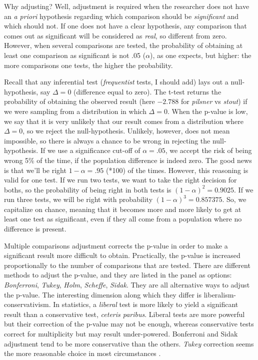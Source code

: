 \documentclass[
]{book}
\begin{document}
Why adjusting? Well, adjustment is required when the researcher does not have an \emph{a priori} hypothesis regarding which comparison should be \emph{significant} and which should not. If one does not have a clear hypothesis, any comparison that comes out as significant will be considered as \emph{real}, so different from zero. However, when several comparisons are tested, the probability of obtaining at least one comparison as significant is not .05 (\(\alpha\)), as one expects, but higher: the more comparisons one tests, the higher the probability.

Recall that any inferential test (\emph{frequentist} tests, I should add) lays out a null-hypothesis, say \(\Delta=0\) (difference equal to zero). The t-test returns the probability of obtaining the observed result (here \(-2.788\) for \emph{pilsner} vs \emph{stout}) if we were sampling from a distribution in which \(\Delta=0\). When the p-value is low, we say that it is very unlikely that our result comes from a distribution where \(\Delta=0\), so we reject the null-hypothesis. Unlikely, however, does not mean impossible, so there is always a chance to be wrong in rejecting the null-hypothesis. If we use a significance cut-off of \(\alpha=.05\), we accept the risk of being wrong 5\% of the time, if the population difference is indeed zero. The good news is that we'll be right \(1-\alpha=.95\) (*100) of the times. However, this reasoning is valid for one test. If we run two tests, we want to take the right decision for boths, so the probability of being right in both tests is \((1-\alpha)^2=0.9025\). If we run three tests, we will be right with probability \((1-\alpha)^3=0.857375\). So, we capitalize on chance, meaning that it becomes more and more likely to get at least one test as significant, even if they all come from a population where no difference is present.

Multiple comparisons adjustment corrects the p-value in order to make a significant result more difficult to obtain. Practically, the p-value is increased proportionally to the number of comparisons that are tested. There are different methods to adjust the p-value, and they are listed in the panel as options: \emph{Bonferroni}, \emph{Tukey}, \emph{Holm}, \emph{Scheffe}, \emph{Sidak}. They are all alternative ways to adjust the p-value. The interesting dimension along which they differ is liberalism-conservativism. In statistics, a \emph{liberal} test is more likely to yield a significant result than a conservative test, \emph{ceteris paribus}. Liberal tests are more powerful but their correction of the p-value may not be enough, whereas conservative tests correct for multiplicity but may result under-powered. Bonferroni and Sidak adjustment tend to be more conservative than the others. \emph{Tukey} correction seems the more reasonable choice in most circumstances \citep{midway2020comparing}.
\end{document}
